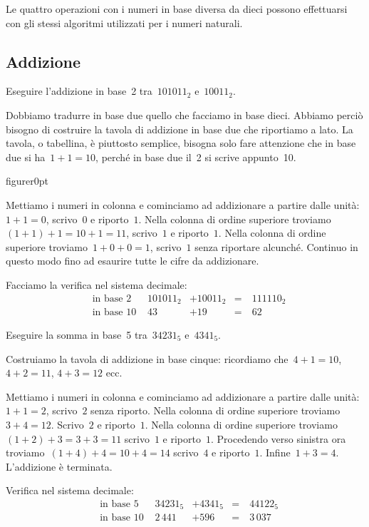 Le quattro operazioni con i numeri in base diversa da dieci possono
effettuarsi con gli stessi algoritmi utilizzati per i numeri naturali.
\pagebreak
\subsection{Addizione}

\begin{exrig}
\begin{esempio}
Eseguire l'addizione in base~2 tra~$101011_{2}$ e~$10011_{2}$.
\end{esempio}

Dobbiamo tradurre in base due quello che facciamo in base dieci. Abbiamo
perciò bisogno di costruire la tavola di addizione in base due che
riportiamo a lato. La tavola, o tabellina, è piuttosto semplice,
bisogna solo fare attenzione che in base due si ha~$1+1=10$, perché in base due il~2 si scrive appunto~10.

\begin{wrapfloat}{figure}{r}{0pt}

\end{wrapfloat}

Mettiamo i numeri in colonna e cominciamo ad addizionare
a partire dalle unità:~$1+1=0$, scrivo~$0$ e riporto~$1$.
Nella colonna di ordine superiore troviamo~$(1+1)+1=10+1=11$, scrivo~$1$ e
riporto~$1$.
Nella colonna di ordine superiore troviamo~$1+0+0=1$, scrivo~$1$ senza
riportare alcunché. Continuo in questo modo fino ad esaurire tutte le cifre da addizionare.

Facciamo la verifica nel sistema decimale:
\begin{align*}
&\text{in base 2 }&101011_{2}&+10011_{2}&=&~111110_{2}\\
&\text{in base 10 }&43&+19&=&~62
\end{align*}
\begin{esempio}
Eseguire la somma in base~5 tra~$34231_{5}$ e~$4341_{5}$.

Costruiamo la tavola di addizione in base cinque: ricordiamo che~$4+1=10$, $4+2=11$, $4+3=12$ ecc.

Mettiamo i numeri in colonna e cominciamo ad addizionare a partire dalle
unità:~$1+1=2$, scrivo~$2$ senza riporto. Nella colonna di ordine superiore
troviamo~$3+4=12$. Scrivo~$2$ e riporto~$1$. Nella colonna di ordine superiore troviamo~$(1+2)+3=3+3=11$ scrivo~$1$ e
riporto~$1$. Procedendo verso sinistra ora troviamo~$(1+4)+4=10+4=14$ scrivo~$4$ e
riporto~$1$. Infine~$1+3=4$. L'addizione è terminata.
\begin{center}
 
\end{center}
Verifica nel sistema decimale:
\begin{align*}
&\text{in base 5 }&34231_{5}&+4341_{5}&=&~44122_{5}\\
&\text{in base 10 }&2\,441&+596&=&~3\,037
\end{align*}
\end{esempio}

\end{exrig}

